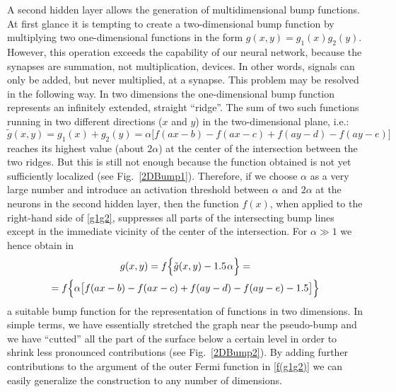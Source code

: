 A second hidden layer allows the generation of multidimensional bump functions. At first glance it is tempting to create a two-dimensional bump function by multiplying two one-dimensional functions in the form $g(x,y)=g_1(x)g_2(y)$. However, this operation exceeds the capability of our neural network, because the synapses are summation, not multiplication, devices. In other words, signals can only be added, but never multiplied, at a synapse. This problem may be resolved in the following way. In two dimensions the one-dimensional bump function represents an infinitely extended, straight ``ridge''. The sum of two such functions running in two different directions ($x$ and $y$) in the two-dimensional plane, i.e.:
\begin{equation}\label{g1g2}
\tilde{g}(x,y)=g_1(x)+g_2(y)=\alpha\bigl[f(ax-b)-f(ax-c)+f(ay-d)-f(ay-e)\bigr]
\end{equation}
reaches its highest value (about $2\alpha$) at the center of the intersection between the two ridges. But this is still not enough because the function obtained is not yet sufficiently localized (see Fig.~\ref{2DBump1}). Therefore, if we choose $\alpha$ as a very large number and introduce an activation threshold between $\alpha$ and $2\alpha$ at the neurons in the second hidden layer, then the function $f(x)$, when applied to the right-hand side of \eqref{g1g2}, suppresses all parts of the intersecting bump lines except in the immediate vicinity of the center of the intersection. For $\alpha\gg1$ we hence obtain in
\begin{multline}\label{f(g1g2)}
g(x,y)=%
f\Bigl\{\tilde{g}(x,y)-1.5\hspace{0.0833em}\alpha\Bigr\}=\\
=f\Bigl\{\alpha\bigl[f(ax-b)-f(ax-c)+f(ay-d)-f(ay-e)-1.5\bigr]\Bigr\}
\end{multline}
a suitable bump function for the representation of functions in two dimensions. In simple terms, we have essentially stretched the graph near the pseudo-bump and we have ``cutted'' all the part of the surface below a certain level in order to shrink less pronounced contributions (see Fig.~\ref{2DBump2}). By adding further contributions to the argument of the outer Fermi function in \eqref{f(g1g2)} we can easily generalize the construction to any number of dimensions.
